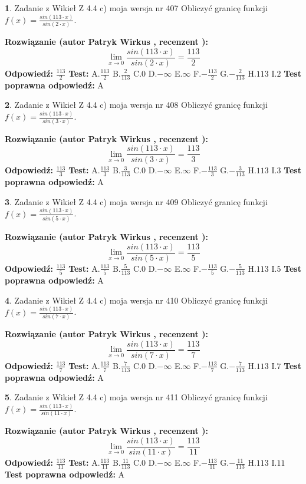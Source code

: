 \documentclass[12pt, a4paper]{article}
\theoremstyle{definition} %
\newtheorem{zad}{}
\newcommand{\zadStart}[1]{\begin{zad}#1\newline}
\newcommand{\zadStop}{\end{zad}}
\newcommand{\rozwStart}[2]{\noindent \textbf{Rozwiązanie (autor #1 , recenzent #2): }\newline}
\newcommand{\rozwStop}{\newline}
\newcommand{\odpStart}{\noindent \textbf{Odpowiedź:}\newline}
\newcommand{\odpStop}{\newline}
\newcommand{\testStart}{\noindent \textbf{Test:}\newline}
\newcommand{\testStop}{\newline}
\newcommand{\kluczStart}{\noindent \textbf{Test poprawna odpowiedź:}\newline}
\newcommand{\kluczStop}{\newline}
\begin{document}
\zadStart{Zadanie z Wikieł Z 4.4 c) moja wersja nr 407}
Obliczyć granicę funkcji $f(x)=\frac{sin(113\cdot x)}{sin(2\cdot x)}$.
\zadStop
\rozwStart{Patryk Wirkus}{}
$$\lim\limits_{x\to 0}\frac{sin(113\cdot x)}{sin(2\cdot x)}=
\frac{113}{2}$$
\rozwStop
\odpStart
$\frac{113}{2}$
\odpStop
\testStart
A.$\frac{113}{2}$
B.$\frac{2}{113}$
C.$0$
D.$-\infty$
E.$\infty$
F.$-\frac{113}{2}$
G.$-\frac{2}{113}$
H.$113$
I.$2$
\testStop
\kluczStart
A
\kluczStop



\zadStart{Zadanie z Wikieł Z 4.4 c) moja wersja nr 408}
Obliczyć granicę funkcji $f(x)=\frac{sin(113\cdot x)}{sin(3\cdot x)}$.
\zadStop
\rozwStart{Patryk Wirkus}{}
$$\lim\limits_{x\to 0}\frac{sin(113\cdot x)}{sin(3\cdot x)}=
\frac{113}{3}$$
\rozwStop
\odpStart
$\frac{113}{3}$
\odpStop
\testStart
A.$\frac{113}{3}$
B.$\frac{3}{113}$
C.$0$
D.$-\infty$
E.$\infty$
F.$-\frac{113}{3}$
G.$-\frac{3}{113}$
H.$113$
I.$3$
\testStop
\kluczStart
A
\kluczStop



\zadStart{Zadanie z Wikieł Z 4.4 c) moja wersja nr 409}
Obliczyć granicę funkcji $f(x)=\frac{sin(113\cdot x)}{sin(5\cdot x)}$.
\zadStop
\rozwStart{Patryk Wirkus}{}
$$\lim\limits_{x\to 0}\frac{sin(113\cdot x)}{sin(5\cdot x)}=
\frac{113}{5}$$
\rozwStop
\odpStart
$\frac{113}{5}$
\odpStop
\testStart
A.$\frac{113}{5}$
B.$\frac{5}{113}$
C.$0$
D.$-\infty$
E.$\infty$
F.$-\frac{113}{5}$
G.$-\frac{5}{113}$
H.$113$
I.$5$
\testStop
\kluczStart
A
\kluczStop



\zadStart{Zadanie z Wikieł Z 4.4 c) moja wersja nr 410}
Obliczyć granicę funkcji $f(x)=\frac{sin(113\cdot x)}{sin(7\cdot x)}$.
\zadStop
\rozwStart{Patryk Wirkus}{}
$$\lim\limits_{x\to 0}\frac{sin(113\cdot x)}{sin(7\cdot x)}=
\frac{113}{7}$$
\rozwStop
\odpStart
$\frac{113}{7}$
\odpStop
\testStart
A.$\frac{113}{7}$
B.$\frac{7}{113}$
C.$0$
D.$-\infty$
E.$\infty$
F.$-\frac{113}{7}$
G.$-\frac{7}{113}$
H.$113$
I.$7$
\testStop
\kluczStart
A
\kluczStop



\zadStart{Zadanie z Wikieł Z 4.4 c) moja wersja nr 411}
Obliczyć granicę funkcji $f(x)=\frac{sin(113\cdot x)}{sin(11\cdot x)}$.
\zadStop
\rozwStart{Patryk Wirkus}{}
$$\lim\limits_{x\to 0}\frac{sin(113\cdot x)}{sin(11\cdot x)}=
\frac{113}{11}$$
\rozwStop
\odpStart
$\frac{113}{11}$
\odpStop
\testStart
A.$\frac{113}{11}$
B.$\frac{11}{113}$
C.$0$
D.$-\infty$
E.$\infty$
F.$-\frac{113}{11}$
G.$-\frac{11}{113}$
H.$113$
I.$11$
\testStop
\kluczStart
A
\kluczStop
\end{document}

